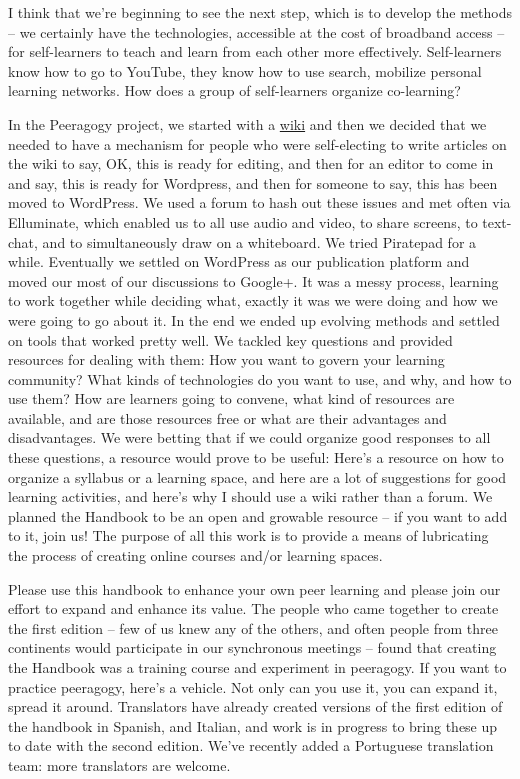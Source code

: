 I think that we're beginning to see the next step, which is to develop
the methods -- we certainly have the technologies, accessible at the
cost of broadband access -- for self-learners to teach and learn from
each other more effectively. Self-learners know how to go to YouTube,
they know how to use search, mobilize personal learning networks. How
does a group of self-learners organize co-learning?

In the Peeragogy project, we started with a
\href{http://socialmediaclassroom.com/host/peeragogy/}{wiki} and then we
decided that we needed to have a mechanism for people who were
self-electing to write articles on the wiki to say, OK, this is ready
for editing, and then for an editor to come in and say, this is ready
for Wordpress, and then for someone to say, this has been moved to
WordPress. We used a forum to hash out these issues and met often via
Elluminate, which enabled us to all use audio and video, to share
screens, to text-chat, and to simultaneously draw on a whiteboard. We
tried Piratepad for a while. Eventually we settled on WordPress as our
publication platform and moved our most of our discussions to Google+.
It was a messy process, learning to work together while deciding what,
exactly it was we were doing and how we were going to go about it. In
the end we ended up evolving methods and settled on tools that worked
pretty well. We tackled key questions and provided resources for dealing
with them: How you want to govern your learning community? What kinds of
technologies do you want to use, and why, and how to use them? How are
learners going to convene, what kind of resources are available, and are
those resources free or what are 
their advantages and disadvantages. We
were betting that if we could organize good responses to all these
questions, a resource would prove to be useful: Here's a resource on how
to organize a syllabus or a learning space, and here are a lot of
suggestions for good learning activities, and here's why I should use a
wiki rather than a forum. We planned the Handbook to be an open and
growable resource -- if you want to add to it, join us! The purpose of
all this work is to provide a means of lubricating the process of
creating online courses and/or learning spaces.

Please use this handbook to enhance your own peer learning and please
join our effort to expand and enhance its value. The people who came
together to create the first edition -- few of us knew any of the
others, and often people from three continents would participate in
our synchronous meetings -- found that creating the Handbook was a
training course and experiment in peeragogy. If you want to practice
peeragogy, here's a vehicle. Not only can you use it, you can expand
it, spread it around. Translators have already created versions of the
first edition of the handbook in Spanish, and Italian, and work is in
progress to bring these up to date with the second edition.
We've recently added a Portuguese translation team: more
translators are welcome.

